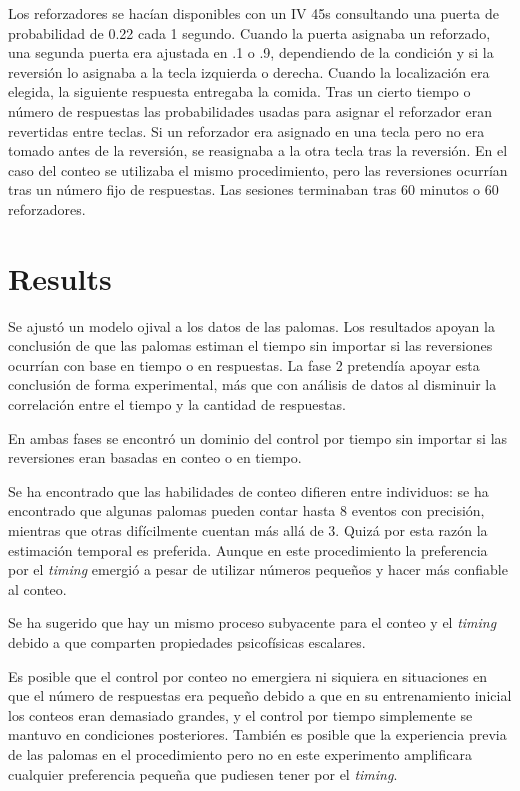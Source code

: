 \documentclass[a4paper,12pt]{article}
\begin{document}
Los reforzadores se hacían disponibles con un IV 45s consultando una puerta de probabilidad de 0.22 cada 1 segundo. Cuando la puerta asignaba un reforzado, una segunda puerta era ajustada en .1 o .9, dependiendo de la condición y si la reversión lo asignaba a la tecla izquierda o derecha. Cuando la localización era elegida, la siguiente respuesta entregaba la comida. Tras un cierto tiempo o número de respuestas las probabilidades usadas para asignar el reforzador eran revertidas entre teclas. Si un reforzador era asignado en una tecla pero no era tomado antes de la reversión, se reasignaba a la otra tecla tras la reversión. En el caso del conteo se utilizaba el mismo procedimiento, pero las reversiones ocurrían tras un número fijo de respuestas.
Las sesiones terminaban tras 60 minutos o 60 reforzadores.

\section{Results}

Se ajustó un modelo ojival a los datos de las palomas. Los resultados apoyan la conclusión de que las palomas estiman el tiempo sin importar si las reversiones ocurrían con base en tiempo o en respuestas. La fase 2 pretendía apoyar esta conclusión de forma experimental, más que con análisis de datos al disminuir la correlación entre el tiempo y la cantidad de respuestas.

En ambas fases se encontró un dominio del control por tiempo sin importar si las reversiones eran basadas en conteo o en tiempo.

Se ha encontrado que las habilidades de conteo difieren entre individuos: se ha encontrado que algunas palomas pueden contar hasta 8 eventos con precisión, mientras que otras difícilmente cuentan más allá de 3. Quizá por esta razón la estimación temporal es preferida. Aunque en este procedimiento la preferencia por el {\itshape timing} emergió a pesar de utilizar números pequeños y hacer más confiable al conteo.

Se ha sugerido que hay un mismo proceso subyacente para el conteo y el {\itshape timing} debido a que comparten propiedades psicofísicas escalares.

Es posible que el control por conteo no emergiera ni siquiera en situaciones en que el número de respuestas era pequeño debido a que en su entrenamiento inicial los conteos eran demasiado grandes, y el control por tiempo simplemente se mantuvo en condiciones posteriores. También es posible que la experiencia previa de las palomas en el procedimiento pero no en este experimento amplificara cualquier preferencia pequeña que pudiesen tener por el {\itshape timing}.
\end{document}

